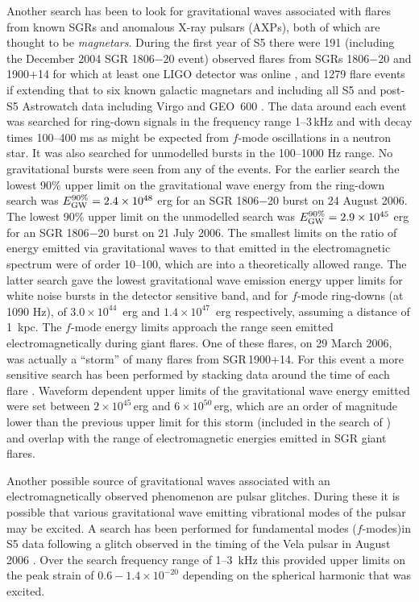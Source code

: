 \documentclass{article}
\begin{document}
Another search has been to look for gravitational waves associated with flares
from known SGRs and anomalous X-ray pulsars (AXPs), both of which are thought to
be {\it magnetars}. During the first year of S5 there were 191 (including the
December 2004 SGR 1806$-$20 event) observed flares from SGRs 1806$-$20 and
1900+14 for which at least one LIGO detector was online \cite{Abbott:2008h}, and
1279 flare events if extending that to six known galactic magnetars and
including all S5 and post-S5 Astrowatch data including Virgo and GEO~600
\cite{Abadie:2010c}. The data around each event was searched for ring-down
signals in the frequency range 1--3\,kHz and with decay times 100--400 ms as
might be expected from $f$-mode oscillations in a neutron star. It was also
searched for unmodelled bursts in the 100--1000 Hz range. No gravitational
bursts were seen from any of the events. For the earlier search
\cite{Abbott:2008h} the lowest 90\% upper limit on the gravitational wave energy
from the ring-down search was $E_{\rm GW}^{90\%} = 2.4\times10^{48}$ erg for an
SGR 1806$-$20 burst on 24 August 2006. The lowest 90\% upper limit on the
unmodelled search was $E_{\rm GW}^{90\%} = 2.9\times10^{45}$ erg for an SGR
1806$-$20 burst on 21 July 2006. The smallest limits on the ratio of energy
emitted via gravitational waves to that emitted in the electromagnetic spectrum
were of order 10--100, which are into a theoretically allowed range. The latter
search \cite{Abadie:2010c} gave the lowest gravitational wave emission energy
upper limits for white noise bursts in the detector sensitive band, and for
$f$-mode ring-downs (at 1090 Hz), of $3.0\times10^{44}$~erg and
$1.4\times10^{47}$~erg respectively, assuming a distance of 1~kpc. The $f$-mode
energy limits approach the range seen emitted electromagnetically during giant
flares. One of these flares, on 29 March 2006, was actually a ``storm'' of many
flares from SGR\,1900+14. For this event a more sensitive search has been
performed by stacking data around the time of each flare \cite{Abbott:2009c}.
Waveform dependent upper limits of the gravitational wave energy emitted were
set between $2\times10^{45}$\,erg and $6\times10^{50}$\,erg, which are an order
of magnitude lower than the previous upper limit for this storm (included in the
search of \cite{Abbott:2008h}) and overlap with the range of electromagnetic
energies emitted in SGR giant flares. 

Another possible source of gravitational waves associated with an  
electromagnetically observed phenomenon are pulsar glitches. During these it is
possible that various gravitational wave emitting vibrational modes of the
pulsar may be excited. A search has been performed for fundamental modes
($f$-modes)in S5 data following a glitch observed in the timing of the Vela
pulsar in August 2006  \cite{Abadie:2010a}. Over the search frequency range
of 1--3~kHz this provided upper limits on the peak strain of
$0.6-1.4\times10^{-20}$ depending on the spherical harmonic that was excited.
\end{document}
